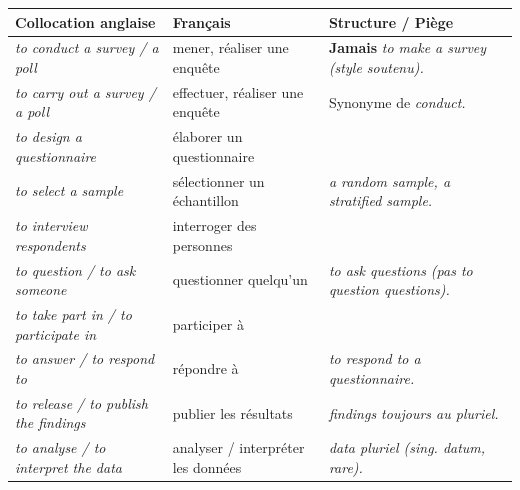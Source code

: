 \documentclass[11pt]{article}
\newcommand{\eng}[1]{\ifmmode\text{\textit{#1}}\else\begingroup\selectlanguage{english}\itshape #1\endgroup\fi}
\begin{document}
\begin{propriete}
\begin{center}
\begin{tabularx}{\linewidth}{|X|X|X|}
\hline
\rowcolor{popblueL} \textbf{Collocation anglaise} & \textbf{Français} & \textbf{Structure / Piège} \\
\hline
\eng{to conduct a survey / a poll} & mener, réaliser une enquête & \textbf{Jamais} \eng{to make a survey} (style soutenu). \\
\hline
\eng{to carry out a survey / a poll} & effectuer, réaliser une enquête & Synonyme de \eng{conduct}. \\
\hline
\eng{to design a questionnaire} & élaborer un questionnaire & \\
\hline
\eng{to select a sample} & sélectionner un échantillon & \eng{a random sample}, \eng{a stratified sample}. \\
\hline
\eng{to interview respondents} & interroger des personnes & \\
\hline
\eng{to question / to ask someone} & questionner quelqu'un & \eng{to ask questions} (pas \eng{to question questions}). \\
\hline
\eng{to take part in} / \eng{to participate in} & participer à & \textbf{Préposition \eng{in} obligatoire}. \\
\hline
\eng{to answer / to respond to} & répondre à & \eng{to respond to a questionnaire}. \\
\hline
\eng{to release / to publish the findings} & publier les résultats & \eng{findings} toujours au pluriel. \\
\hline
\eng{to analyse / to interpret the data} & analyser / interpréter les données & \eng{data} pluriel (sing. \eng{datum}, rare). \\
\hline
\end{tabularx}
\end{center}
\end{propriete}
\end{document}
